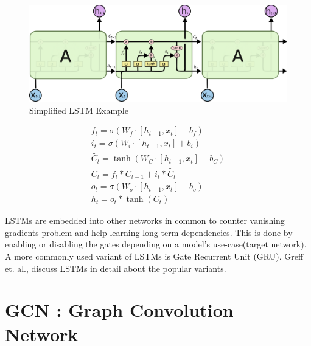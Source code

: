 \begin{figure}[h!]
	\centering
	\includegraphics[scale=0.40]{figures/LSTMARCH.PNG}
	\caption{Simplified LSTM Example \cite{colah}}
	\label{fig:lstmsim}
\end{figure}

\begin{subequations}
	\label{eq1}
	\begin{align}
		\displaystyle f_t =\sigma \left(W_f \cdot\left[h_{t-1},x_t\right] + b_f\right) \label{equ:one} \\
		\displaystyle i_t =\sigma \left(W_i \cdot\left[h_{t-1},x_t\right] + b_i\right) \label{equ:two} \\
		\displaystyle \widetilde{C_t} = \tanh \left(W_C \cdot \left[h_{t-1},x_t\right] + b_C\right) \label{equ:three} \\
		\displaystyle C_t = f_t * C_{t-1} + i_t * \widetilde{C_t} \label{equ:four} \\
		\displaystyle o_t =\sigma \left(W_o \cdot\left[h_{t-1},x_t\right] + b_o\right) \label{equ:five} \\
		\displaystyle h_t = o_t * \tanh \left(C_t\right) \label{equ:six}
	\end{align}
\end{subequations}
\newpar





\newpar
LSTMs are embedded into other networks in common to counter vanishing gradients problem and help learning long-term dependencies. This is done by enabling or disabling the gates depending on a model's use-case(target network). A more commonly used variant of LSTMs is Gate Recurrent Unit (GRU). Greff et. al.,\cite{greff2016lstm} discuss LSTMs in detail about the popular variants.

\section{GCN : Graph Convolution Network}

